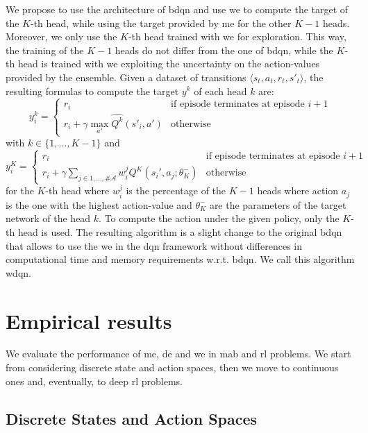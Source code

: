 We propose to use the architecture of \gls{bdqn} and use \gls{we} to compute the target of the $K$-th head, while using the target provided by \gls{me} for the other $K-1$ heads. Moreover, we only use the $K$-th head trained with \gls{we} for exploration. This way, the training of the $K-1$ heads do not differ from the one of \gls{bdqn}, while the $K$-th head is trained with \gls{we} exploiting the uncertainty on the action-values provided by the ensemble. Given a dataset of transitions $\langle s_t, a_t, r_t, s'_t \rangle$, the resulting formulas to compute the target $y^k$ of each head $k$ are:
\begin{equation}\label{E:dqn_update}
y_i^k=
    \begin{cases}
    r_i & \text{if episode terminates at episode }i+1\\
    r_i + \gamma \max_{a'} \hat{Q^k}(s'_i, a') & \text{otherwise}
    \end{cases}
\end{equation}
with $k \in \lbrace 1, \dots, K-1 \rbrace$ and
\begin{equation}\label{E:dqn_update}
y_i^K=
    \begin{cases}
    r_i & \text{if episode terminates at episode }i+1\\
    r_i + \gamma \sum_{j \in {1, \dots, \#\mathcal{A}}} w^j_i Q^K(s_i', a_j; \theta_K^-) & \text{otherwise}
    \end{cases}
\end{equation}
for the $K$-th head where $w^j_i$ is the percentage of the $K-1$ heads where action $a_j$ is the one with the highest action-value and $\theta_K^-$ are the parameters of the target network of the head $k$. To compute the action under the given policy, only the $K$-th head is used.
The resulting algorithm is a slight change to the original \gls{bdqn} that allows to use the \gls{we} in the \gls{dqn} framework without differences in computational time and memory requirements w.r.t. \gls{bdqn}. We call this algorithm \gls{wdqn}.

\section{Empirical results}
We evaluate the performance of \gls{me}, \gls{de} and \gls{we} in \gls{mab} and \gls{rl} problems. We start from considering discrete state and action spaces, then we move to continuous ones and, eventually, to deep \gls{rl} problems.

\subsection{Discrete States and Action Spaces}

